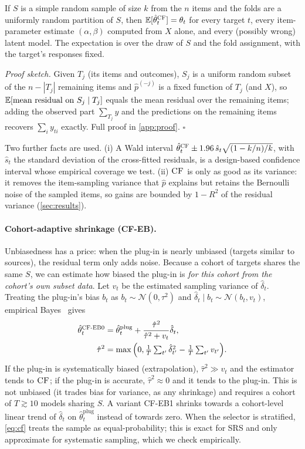 \begin{proposition}[Unbiasedness]
\label{prop:unb}
If $S$ is a simple random sample of size $k$ from the $n$ items and the folds are a uniformly random partition of $S$, then $\mathbb{E}[\hat\theta^{\textsc{CF}}_t]=\theta_t$ for every target $t$, every item-parameter estimate $(\alpha,\beta)$ computed from $X$ alone, and every (possibly wrong) latent model. The expectation is over the draw of $S$ and the fold assignment, with the target's responses fixed.
\end{proposition}
\noindent\emph{Proof sketch.} Given $T_j$ (its items and outcomes), $S_j$ is a uniform random subset of the $n-|T_j|$ remaining items and $\hat p^{(-j)}$ is a fixed function of $T_j$ (and $X$), so $\mathbb{E}[\text{mean residual on } S_j\mid T_j]$ equals the mean residual over the remaining items; adding the observed part $\sum_{T_j} y$ and the predictions on the remaining items recovers $\sum_i y_{ti}$ exactly. Full proof in \cref{app:proof}. \hfill$\square$

Two further facts are used. (i) A Wald interval $\hat\theta^{\textsc{CF}}_t\pm1.96\,\hat s_t\sqrt{(1-k/n)/k}$, with $\hat s_t$ the standard deviation of the cross-fitted residuals, is a design-based confidence interval whose empirical coverage we test. (ii) $\textsc{CF}$ is only as good as its variance: it removes the item-sampling variance that $\hat p$ explains but retains the Bernoulli noise of the sampled items, so gains are bounded by $1-R^2$ of the residual variance (\cref{sec:results}).

\paragraph{Cohort-adaptive shrinkage (CF-EB).}
Unbiasedness has a price: when the plug-in is nearly unbiased (targets similar to sources), the residual term only adds noise.
Because a cohort of targets shares the same $S$, we can estimate how biased the plug-in is \emph{for this cohort from the cohort's own subset data}. Let $v_t$ be the estimated sampling variance of $\hat\delta_t$. Treating the plug-in's bias $b_t$ as $b_t\sim\mathcal N(0,\tau^2)$ and $\hat\delta_t\mid b_t\sim\mathcal N(b_t,v_t)$, empirical Bayes~\citep{efron1973stein} gives
\begin{align}
\hat\theta^{\textsc{CF-EB} 0}_t&=\hat\theta^{\mathrm{plug}}_t+\frac{\hat\tau^2}{\hat\tau^2+v_t}\hat\delta_t,\label{eq:eb}\\
\hat\tau^2&=\max\Big(0,\tfrac1T\textstyle\sum_{t'}\hat\delta_{t'}^2-\tfrac1T\sum_{t'}v_{t'}\Big).\nonumber
\end{align}
If the plug-in is systematically biased (extrapolation), $\hat\tau^2\gg v_t$ and the estimator tends to $\textsc{CF}$; if the plug-in is accurate, $\hat\tau^2\approx0$ and it tends to the plug-in. This is not unbiased (it trades bias for variance, as any shrinkage) and requires a cohort of $T\gtrsim 10$ models sharing $S$. A variant \textsc{CF-EB1} shrinks towards a cohort-level linear trend of $\hat\delta_t$ on $\hat\theta^{\mathrm{plug}}_t$ instead of towards zero.
When the selector is stratified, \cref{eq:cf} treats the sample as equal-probability; this is exact for SRS and only approximate for systematic sampling, which we check empirically.

